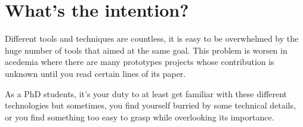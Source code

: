 \section{What's the intention?}
Different tools and techniques are countless, it is easy to be overwhelmed by the huge number of tools that aimed at the same goal.
This problem is worsen in acedemia where there are many prototypes projects whose contribution is unknown until you read certain lines of its paper.

As a PhD students, it's your duty to at least get familiar with these different technologies but sometimes, you find yourself burried by some 
technical details, or you find something too easy to grasp while overlooking its importance.

